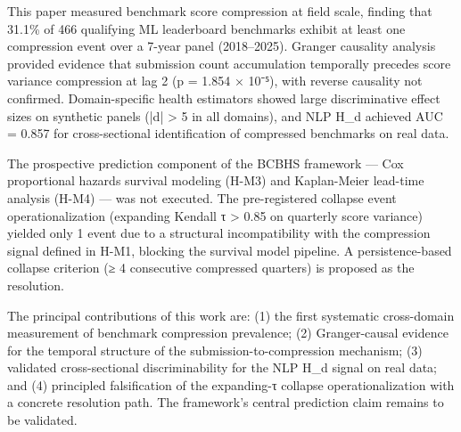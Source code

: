 
This paper measured benchmark score compression at field scale, finding that 31.1\% of 466 qualifying ML leaderboard benchmarks exhibit at least one compression event over a 7-year panel (2018–2025). Granger causality analysis provided evidence that submission count accumulation temporally precedes score variance compression at lag 2 (p = 1.854 × 10⁻⁵), with reverse causality not confirmed. Domain-specific health estimators showed large discriminative effect sizes on synthetic panels (|d| > 5 in all domains), and NLP H_d achieved AUC = 0.857 for cross-sectional identification of compressed benchmarks on real data.

The prospective prediction component of the BCBHS framework — Cox proportional hazards survival modeling (H-M3) and Kaplan-Meier lead-time analysis (H-M4) — was not executed. The pre-registered collapse event operationalization (expanding Kendall τ > 0.85 on quarterly score variance) yielded only 1 event due to a structural incompatibility with the compression signal defined in H-M1, blocking the survival model pipeline. A persistence-based collapse criterion (≥ 4 consecutive compressed quarters) is proposed as the resolution.

The principal contributions of this work are: (1) the first systematic cross-domain measurement of benchmark compression prevalence; (2) Granger-causal evidence for the temporal structure of the submission-to-compression mechanism; (3) validated cross-sectional discriminability for the NLP H_d signal on real data; and (4) principled falsification of the expanding-τ collapse operationalization with a concrete resolution path. The framework's central prediction claim remains to be validated.

